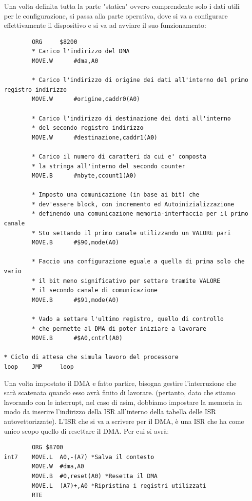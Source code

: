 Una volta definita tutta la parte "statica" ovvero comprendente solo i dati utili per le configurazione, si passa alla parte operativa, dove si va a configurare effettivamente il dispositivo e si va ad avviare il suo funzionamento:
\begin{lstlisting}
        ORG 	$8200
        * Carico l'indirizzo del DMA
	    MOVE.W	    #dma,A0			

        * Carico l'indirizzo di origine dei dati all'interno del primo registro indirizzo
	    MOVE.W  	#origine,caddr0(A0)
        
        * Carico l'indirizzo di destinazione dei dati all'interno
        * del secondo registro indirizzo
        MOVE.W  	#destinazione,caddr1(A0)		

        * Carico il numero di caratteri da cui e' composta
        * la stringa all'interno del secondo counter
	    MOVE.B  	#nbyte,ccount1(A0)		

        * Imposto una comunicazione (in base ai bit) che 
        * dev'essere block, con incremento ed Autoinizializzazione
        * definendo una comunicazione memoria-interfaccia per il primo canale
        * Sto settando il primo canale utilizzando un VALORE pari
        MOVE.B  	#$90,mode(A0)		

        * Faccio una configurazione eguale a quella di prima solo che vario
        * il bit meno significativo per settare tramite VALORE
        * il secondo canale di comunicazione
	    MOVE.B	    #$91,mode(A0)		

        * Vado a settare l'ultimo registro, quello di controllo
        * che permette al DMA di poter iniziare a lavorare
	    MOVE.B	    #$A0,cntrl(A0)			

* Ciclo di attesa che simula lavoro del processore
loop	JMP	    loop
\end{lstlisting}

Una volta impostato il DMA e fatto partire, bisogna gestire l'interruzione che sarà scatenata quando esso avrà finito di lavorare. (pertanto, dato che stiamo lavorando con le interrupt, nel caso di asim, dobbiamo impostare la memoria in modo da inserire l'indirizzo della ISR all'interno della tabella delle ISR autovettorizzate).
L'ISR che si va a scrivere per il DMA, è una ISR che ha come unico scopo quello di resettare il DMA. Per cui si avrà:
\begin{lstlisting}
	    ORG $8700
int7	MOVE.L	A0,-(A7) *Salva il contesto
		MOVE.W	#dma,A0					
		MOVE.B	#0,reset(A0) *Resetta il DMA
		MOVE.L	(A7)+,A0 *Ripristina i registri utilizzati
		RTE
\end{lstlisting}
